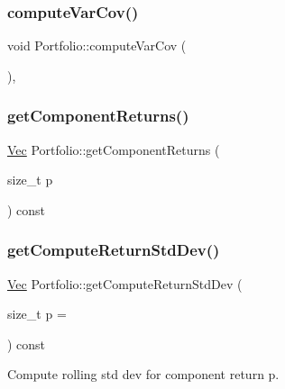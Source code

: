 \subsubsection{\texorpdfstring{compute\+Var\+Cov()}{computeVarCov()}}
{\footnotesize\ttfamily void Portfolio\+::compute\+Var\+Cov (\begin{DoxyParamCaption}{ }\end{DoxyParamCaption})\hspace{0.3cm}{\ttfamily [inline]}, {\ttfamily [protected]}}

\hypertarget{classPortfolio_aa235d5de98468ec656ddff1550fe5fbf}{}\label{classPortfolio_aa235d5de98468ec656ddff1550fe5fbf} 
\subsubsection{\texorpdfstring{get\+Component\+Returns()}{getComponentReturns()}}
{\footnotesize\ttfamily \hyperlink{compute__returns__eigen_8h_a1eb6a9306ef406d7975f3cbf2e247777}{Vec} Portfolio\+::get\+Component\+Returns (\begin{DoxyParamCaption}\item[{size\+\_\+t}]{p }\end{DoxyParamCaption}) const}

\hypertarget{classPortfolio_a539d00aaacb83cb6b7ed8862db277a0b}{}\label{classPortfolio_a539d00aaacb83cb6b7ed8862db277a0b} 
\subsubsection{\texorpdfstring{get\+Compute\+Return\+Std\+Dev()}{getComputeReturnStdDev()}}
{\footnotesize\ttfamily \hyperlink{compute__returns__eigen_8h_a1eb6a9306ef406d7975f3cbf2e247777}{Vec} Portfolio\+::get\+Compute\+Return\+Std\+Dev (\begin{DoxyParamCaption}\item[{size\+\_\+t}]{p = {} }\end{DoxyParamCaption}) const}



Compute rolling std dev for component return p. 

\hypertarget{classPortfolio_aa91be98ef8fdd16bd3ebc9aa66529554}{}\label{classPortfolio_aa91be98ef8fdd16bd3ebc9aa66529554} 
